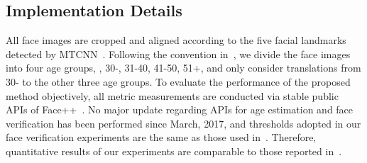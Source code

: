 \documentclass[10pt,twocolumn,letterpaper]{article}
\begin{document}
\subsection{Implementation Details}
All face images are cropped and aligned according to the five facial landmarks detected by MTCNN~\cite{zhang2016joint}. 
Following the convention in~\cite{yang2017learning,li2018global}, we divide the face images into four age groups, \ie, 30-, 31-40, 41-50, 51+, and only consider translations from 30- to the other three age groups.
To evaluate the performance of the proposed method objectively, all metric measurements are conducted via stable public APIs of Face++~\cite{face2018toolkit}. No major update regarding APIs for age estimation and face verification has been performed since March, 2017, and thresholds adopted in our face verification experiments are the same as those used in~\cite{yang2017learning}. Therefore, quantitative results of our experiments are comparable to those reported in~\cite{yang2017learning}.
\end{document}
